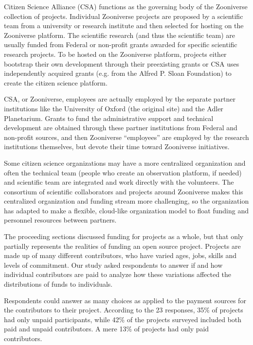 Citizen Science Alliance (CSA) functions as the governing body of the Zooniverse collection of projects. Individual Zooniverse projects are proposed by a scientific team from a university or research institute and then selected for hosting on the Zooniverse platform. The scientific research (and thus the scientific team) are usually funded from Federal or non-profit grants awarded for specific scientific research projects. To be hosted on the Zooniverse platform, projects either bootstrap their own development through their preexisting grants or CSA uses independently acquired grants (e.g. from the Alfred P. Sloan Foundation) to create the citizen science platform.
 
CSA, or Zooniverse, employees are actually employed by the separate partner institutions like the University of Oxford (the original site) and the Adler Planetarium. Grants to fund the administrative support and technical development are obtained through these partner institutions from Federal and non-profit sources, and then Zooniverse “employees” are employed by the research institutions themselves, but devote their time toward Zooniverse initiatives.
 
Some citizen science organizations may have a more centralized organization and often the technical team (people who create an observation platform, if needed) and scientific team are integrated and work directly with the volunteers. The consortium of scientific collaborators and projects around Zooniverse makes this centralized organization and funding stream more challenging, so the organization has adapted to make a flexible, cloud-like organization model to float funding and personnel resources between partners.


The proceeding sections discussed funding for projects as a whole, but that only partially represents the realities of funding an open source project. Projects are made up of many different contributors, who have varied ages, jobs, skills and levels of commitment. Our study asked respondents to answer if and how individual contributors are paid to analyze how these variations affected the distributions of funds to individuals. 

Respondents could answer as many choices as applied to the payment sources for the contributors to their project. According to the 23 responses, 35\% of projects had only unpaid participants, while 42\% of the projects surveyed included both paid and unpaid contributors. A mere 13\% of projects had only paid contributors.

